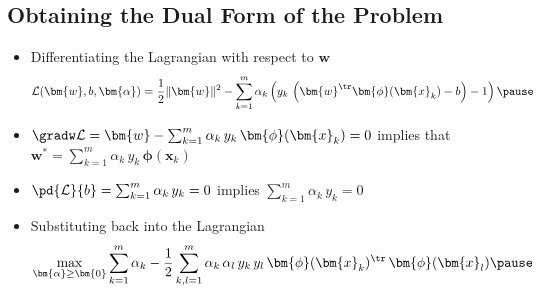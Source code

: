 \begin{slide}
\section[-2]{Obtaining the Dual Form of the Problem}

\begin{PauseHighLight}
  \begin{itemize}
  \item Differentiating the Lagrangian with respect to $\bm{w}$
    \begin{align*}
      \mathcal{L}(\bm{w}, b, \bm{\alpha}) = \frac{1}{2} \|\bm{w}\|^2 
      - \sum_{k=1}^m \alpha_k \left(\strut
      y_k\,\left(\bm{w}^{\tr} \bm{\phi}(\bm{x}_k) -  b\right) - 1 \right)\pause
    \end{align*}
  \item $\gradw \mathcal{L}=\bm{w} -\sum_{k=1}^m \alpha_k\,y_k\,\bm{\phi}(\bm{x}_k)= 0$ implies that $\bm{w}^* = \sum_{k=1}^m
  \alpha_k\, y_k\, \bm{\phi}(\bm{x}_k)$\pause
  \item $\pd{\mathcal{L}}{b}=\sum_{k=1}^m \alpha_k\, y_k=0$ implies $\sum_{k=1}^m \alpha_k\, y_k = 0$
    \pause
  \item Substituting back into the Lagrangian
   \begin{align*}
      \max_{\bm{\alpha}\geq\bm{0}} \sum_{k=1}^m \alpha_k 
      - \frac{1}{2} \sum_{k,l=1}^m \alpha_k\,\alpha_l
      \,y_k\,y_l\,\bm{\phi}(\bm{x}_k)^\tr\, \bm{\phi}(\bm{x}_l)\pause
    \end{align*}    
  \end{itemize}
\end{PauseHighLight}

\end{slide}


